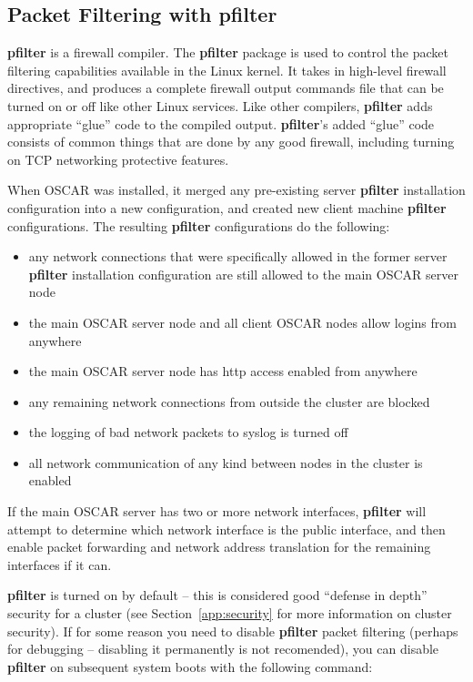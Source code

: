 %
%
%

\subsection{Packet Filtering with pfilter}
\label{app:pfilter-overview}

{\bf pfilter} is a firewall compiler.  The {\bf pfilter} package is
used to control the packet filtering capabilities available in the
Linux kernel.  It takes in high-level firewall directives, and
produces a complete firewall output commands file that can be turned
on or off like other Linux services.  Like other compilers, {\bf
  pfilter} adds appropriate ``glue'' code to the compiled output.
{\bf pfilter}'s added ``glue'' code consists of common things that are
done by any good firewall, including turning on TCP networking
protective features.

When OSCAR was installed, it merged any pre-existing server 
{\bf pfilter} installation configuration into a new configuration,
and created new client machine {\bf pfilter} configurations. 
The resulting {\bf pfilter} configurations do the following:

\begin{itemize}
\item any network connections that were specifically allowed in the
former server {\bf pfilter} installation configuration are still allowed 
to the main OSCAR server node
\item the main OSCAR server node and all client OSCAR nodes allow logins from anywhere
\item the main OSCAR server node has http access enabled from anywhere
\item any remaining network connections from outside the cluster are blocked
\item the logging of bad network packets to syslog is turned off
\item all network communication of any kind between nodes in the cluster is enabled
\end{itemize}

If the main OSCAR server has two or more network interfaces, {\bf pfilter}
will attempt to determine which network interface is the public interface,
and then enable packet forwarding and network address translation for the 
remaining interfaces if it can.

{\bf pfilter} is turned on by default -- this is considered good
``defense in depth'' security for a cluster (see
Section~\ref{app:security} for more information on cluster security).
If for some reason you need to disable {\bf pfilter} packet filtering
(perhaps for debugging -- disabling it permanently is not recomended),
you can disable {\bf pfilter} on subsequent system boots with the
following command:

